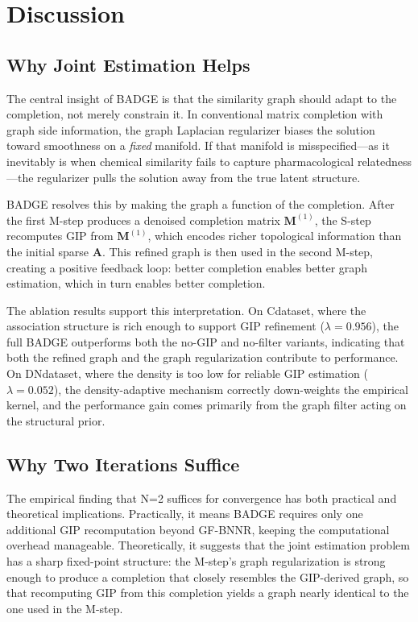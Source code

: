 \documentclass{oup-authoring-template}
\begin{document}
\section{Discussion}

\subsection{Why Joint Estimation Helps}

The central insight of BADGE is that the similarity graph should adapt to the completion, not merely constrain it. In conventional matrix completion with graph side information, the graph Laplacian regularizer biases the solution toward smoothness on a \emph{fixed} manifold. If that manifold is misspecified---as it inevitably is when chemical similarity fails to capture pharmacological relatedness---the regularizer pulls the solution away from the true latent structure.

BADGE resolves this by making the graph a function of the completion. After the first M-step produces a denoised completion matrix $\mathbf{M}^{(1)}$, the S-step recomputes GIP from $\mathbf{M}^{(1)}$, which encodes richer topological information than the initial sparse $\mathbf{A}$. This refined graph is then used in the second M-step, creating a positive feedback loop: better completion enables better graph estimation, which in turn enables better completion.

The ablation results support this interpretation. On Cdataset, where the association structure is rich enough to support GIP refinement ($\lambda = 0.956$), the full BADGE outperforms both the no-GIP and no-filter variants, indicating that both the refined graph and the graph regularization contribute to performance. On DNdataset, where the density is too low for reliable GIP estimation ($\lambda = 0.052$), the density-adaptive mechanism correctly down-weights the empirical kernel, and the performance gain comes primarily from the graph filter acting on the structural prior.

\subsection{Why Two Iterations Suffice}

The empirical finding that N=2 suffices for convergence has both practical and theoretical implications. Practically, it means BADGE requires only one additional GIP recomputation beyond GF-BNNR, keeping the computational overhead manageable. Theoretically, it suggests that the joint estimation problem has a sharp fixed-point structure: the M-step's graph regularization is strong enough to produce a completion that closely resembles the GIP-derived graph, so that recomputing GIP from this completion yields a graph nearly identical to the one used in the M-step.
\end{document}
